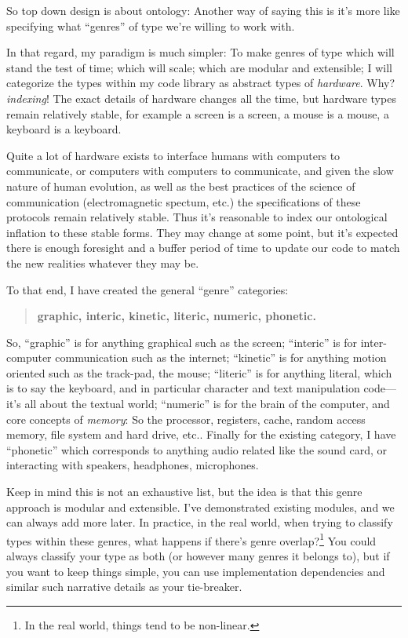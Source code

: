 \documentclass[twoside]{article}
\begin{document}
So top down design is about ontology: Another way of saying this is it's more like specifying what ``genres'' of type
we're willing to work with.

In that regard, my paradigm is much simpler: To make genres of type which will stand the test of time; which will
scale; which are modular and extensible; I will categorize the types within my code library as abstract types of
\emph{hardware}. Why? \emph{indexing}! The exact details of hardware changes all the time, but hardware types remain
relatively stable, for example a screen is a screen, a mouse is a mouse, a keyboard is a keyboard.

Quite a lot of hardware exists to interface humans with computers to communicate, or computers with computers to communicate,
and given the slow nature of human evolution, as well as the best practices of the science of communication (electromagnetic
spectum, etc.) the specifications of these protocols remain relatively stable. Thus it's reasonable to index our
ontological inflation to these stable forms. They may change at some point, but it's expected there is enough foresight
and a buffer period of time to update our code to match the new realities whatever they may be.

To that end, I have created the general ``genre'' categories:

\begin{verse}\bfseries
graphic, interic, kinetic, literic, numeric, phonetic.
\end{verse}

So, ``graphic'' is for anything graphical such as the screen; ``interic'' is for inter-computer communication such as the
internet; ``kinetic'' is for anything motion oriented such as the track-pad, the mouse; ``literic'' is for anything literal,
which is to say the keyboard, and in particular character and text manipulation code---it's all about the textual world; ``numeric''
is for the brain of the computer, and core concepts of \emph{memory}: So the processor, registers, cache, random access memory,
file system and hard drive, etc.. Finally for the existing category, I have ``phonetic'' which corresponds to anything audio
related like the sound card, or interacting with speakers, headphones, microphones.

Keep in mind this is not an exhaustive list, but the idea is that this genre approach is modular and extensible. I've
demonstrated existing modules, and we can always add more later. In practice, in the real world, when trying to classify
types within these genres, what happens if there's genre overlap?\footnote{In the real world, things tend to be non-linear.}
You could always classify your type as both (or however many genres it belongs to), but if you want to keep things simple,
you can use implementation dependencies and similar such narrative details as your tie-breaker.
\end{document}

